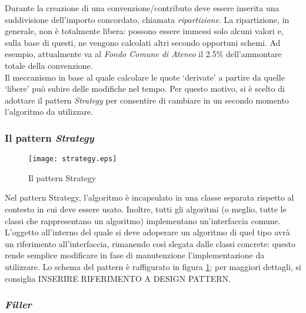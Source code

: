 Durante la creazione di una convenzione/contributo deve essere inserita una suddivisione dell'importo concordato, chiamata \textsl{ripartizione}. La ripartizione, in generale, non è totalmente libera: possono essere immessi solo alcuni valori e, sulla base di questi, ne vengono calcolati altri secondo opportuni schemi. Ad esempio, attualmente va al \textsl{Fondo Comune di Ateneo} il 2.5\% dell'ammontare totale della convenzione. \\
Il meccanismo in base al quale calcolare le quote \textquoteleft derivate\textquoteright{} a partire da quelle \textquoteleft libere\textquoteright{} può subire delle modifiche nel tempo. Per questo motivo, si è scelto di adottare il pattern \textsl{Strategy} per consentire di cambiare in un secondo momento l'algoritmo da utilizzare.\\

\subsubsection{Il pattern \textsl{Strategy}}

\begin{figure}[h]
\centering
\texttt{[image: strategy.eps]}
\caption{Il pattern Strategy}
\label{strategy}
\end{figure}


Nel pattern Strategy, l'algoritmo è incapsulato in una classe separata rispetto al contesto in cui deve essere usato. Inoltre, tutti gli algoritmi (o meglio, tutte le classi che rappresentano un algoritmo) implementano un'interfaccia comune. L'oggetto all'interno del quale si deve adoperare un algoritmo di quel tipo avrà un riferimento all'interfaccia, rimanendo così slegata dalle classi concrete: questo rende semplice modificare in fase di manutenzione l'implementazione da utilizzare. Lo schema del pattern è raffigurato in figura \ref{strategy}; per maggiori dettagli, si consiglia INSERIRE RIFERIMENTO A DESIGN PATTERN.\\

\subsubsection{\textsl{Filler}}

